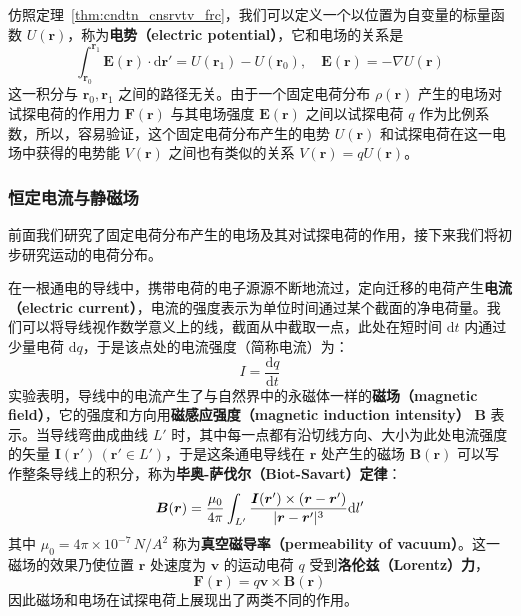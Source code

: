 \documentclass[cn,10pt,math=newtx,citestyle=gb7714-2015,bibstyle=gb7714-2015]{elegantbook}
\def\bm{\boldsymbol}
\def\d{\mathrm d}
\begin{document}
仿照定理~\ref{thm:cndtn_cnsrvtv_frc}，我们可以定义一个以位置为自变量的标量函数 $U(\bm r)$，称为\textbf{电势（electric potential）}，它和电场的关系是
\begin{equation*}
    \int_{\bm r_0}^{\bm r_1}\bm E(\bm r)\cdot\bm{\d\bm r'} = U(\bm r_1)-U(\bm r_0),\quad \bm E(\bm r) = -\nabla U(\bm r)
\end{equation*}
这一积分与 $\bm r_0,\bm r_1$ 之间的路径无关。由于一个固定电荷分布 $\rho(\bm r)$ 产生的电场对试探电荷的作用力 $\bm F(\bm r)$ 与其电场强度 $\bm E(\bm r)$ 之间以试探电荷 $q$ 作为比例系数，所以，容易验证，这个固定电荷分布产生的电势 $U(\bm r)$ 和试探电荷在这一电场中获得的电势能 $V(\bm r)$ 之间也有类似的关系 $V(\bm r) = qU(\bm r)$。

\subsubsection{恒定电流与静磁场}
前面我们研究了固定电荷分布产生的电场及其对试探电荷的作用，接下来我们将初步研究运动的电荷分布。

在一根通电的导线中，携带电荷的电子源源不断地流过，定向迁移的电荷产生\textbf{电流（electric current）}，电流的强度表示为单位时间通过某个截面的净电荷量。我们可以将导线视作数学意义上的线，截面从中截取一点，此处在短时间 $\d t$ 内通过少量电荷 $\d q$，于是该点处的电流强度（简称电流）为：
\begin{equation*}
    I = \frac{\d q}{\d t}
\end{equation*}
实验表明，导线中的电流产生了与自然界中的永磁体一样的\textbf{磁场（magnetic field）}，它的强度和方向用\textbf{磁感应强度（magnetic induction intensity）} $\bm B$ 表示。当导线弯曲成曲线 $L'$ 时，其中每一点都有沿切线方向、大小为此处电流强度的矢量 $\bm I(\bm r')\,(\bm r '\in L')$，于是这条通电导线在 $\bm r$ 处产生的磁场 $\bm B(\bm r)$ 可以写作整条导线上的积分，称为\textbf{毕奥-萨伐尔（Biot-Savart）定律}：
    \begin{equation*}
        \bm B(\bm r) = \frac{\mu_0}{4\pi}\int_{L'}\frac{\bm I(\bm r')\times(\bm r-\bm r')}{|\bm r-\bm r'|^3}\text dl'
    \end{equation*}
其中 $\mu_0=4\pi\times 10^{-7}\,\si{N/A^2}$ 称为\textbf{真空磁导率（permeability of vacuum）}。这一磁场的效果乃使位置 $\bm r$ 处速度为 $\bm v$ 的运动电荷 $q$ 受到\textbf{洛伦兹（Lorentz）力}，
\begin{equation}\label{eq:lrntz_frc}
    \bm F(\bm r)=q\bm v\times\bm B(\bm r)
\end{equation}
因此磁场和电场在试探电荷上展现出了两类不同的作用。
\end{document}
